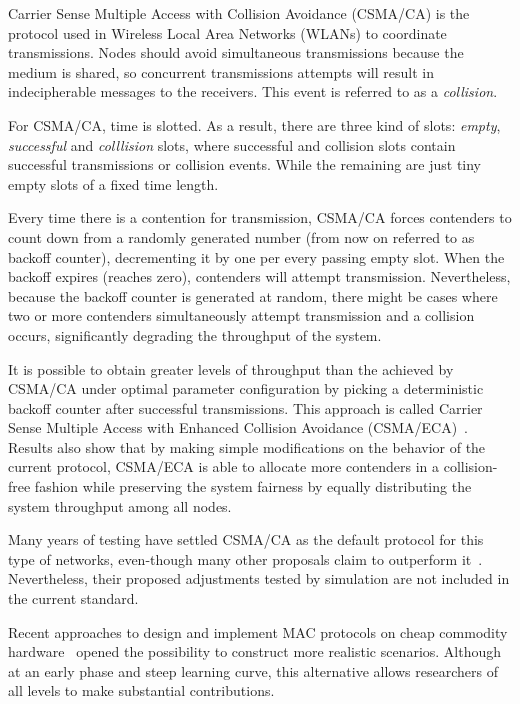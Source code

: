 Carrier Sense Multiple Access with Collision Avoidance (CSMA/CA) is the protocol used in Wireless Local Area Networks (WLANs) to coordinate transmissions. Nodes should avoid simultaneous transmissions because the medium is shared, so concurrent transmissions attempts will result in indecipherable messages to the receivers. This event is referred to as a \emph{collision}. 

For CSMA/CA, time is slotted. As a result, there are three kind of slots: \emph{empty}, \emph{successful} and \emph{colllision} slots, where successful and collision slots contain successful transmissions or collision events. While the remaining are just tiny empty slots of a fixed time length.

Every time there is a contention for transmission, CSMA/CA forces contenders to count down from a randomly generated number (from now on referred to as backoff counter), decrementing it by one per every passing empty slot. When the backoff expires (reaches zero), contenders will attempt transmission. Nevertheless, because the backoff counter is generated at random, there might be cases where two or more contenders simultaneously attempt transmission and a collision occurs, significantly degrading the throughput of the system.

It is possible to obtain greater levels of throughput than the achieved by CSMA/CA under optimal parameter configuration by picking a deterministic backoff counter after successful transmissions. This approach is called Carrier Sense Multiple Access with Enhanced Collision Avoidance (CSMA/ECA)~\cite{CSMA_ECA}. Results also show that by making simple modifications on the behavior of the current protocol, CSMA/ECA is able to allocate more contenders in a collision-free fashion while preserving the system fairness by equally distributing the system throughput among all nodes. 
% 

Many years of testing have settled CSMA/CA as the default protocol for this type of networks, even-though many other proposals claim to outperform it~\cite{CSMA_ECA,bellalta2009vtc,L_MAC2,HE}. Nevertheless, their proposed adjustments tested by simulation are not included in the current standard.

Recent approaches to design and implement MAC protocols on cheap commodity hardware~\cite{WMP,FLAVIA} opened the possibility to construct more realistic scenarios. Although at an early phase and steep learning curve, this alternative allows researchers of all levels to make substantial contributions.

